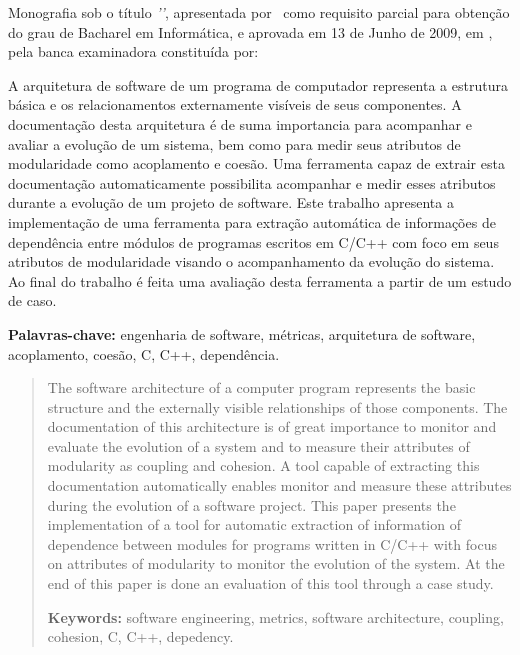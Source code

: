 

\capa
\folhaderosto

\begin{folhadeaprovacao}
 Monografia sob o título \textit{'\ABNTtitulodata'}, apresentada por
 \ABNTautordata\ como requisito parcial para obtenção do grau de Bacharel em
 Informática, e aprovada em 13 de Junho de 2009, em \ABNTlocaldata, pela banca
 examinadora constituída por:
\end{folhadeaprovacao}

\begin{resumo}
A arquitetura de software de um programa de computador representa a estrutura
básica e os relacionamentos externamente visíveis de seus componentes. A
documentação desta arquitetura é de suma importancia para acompanhar e avaliar
a evolução de um sistema, bem como para medir seus atributos de modularidade
como acoplamento e coesão. Uma ferramenta capaz de extrair esta documentação
automaticamente possibilita acompanhar e medir esses atributos durante a
evolução de um projeto de software. Este trabalho apresenta a implementação de
uma ferramenta para extração automática de informações de dependência entre
módulos de programas escritos em C/C++ com foco em seus atributos de
modularidade visando o acompanhamento da evolução do sistema. Ao final do
trabalho é feita uma avaliação desta ferramenta a partir de um
estudo de caso.

{\bf Palavras-chave:} engenharia de software, métricas, arquitetura de
software, acoplamento, coesão, C, C++, dependência.
\end{resumo}

\begin{abstract}
The software architecture of a computer program represents the basic structure
and the externally visible relationships of those components. The documentation
of this architecture is of great importance to monitor and evaluate the
evolution of a system and to measure their attributes of modularity as coupling
and cohesion. A tool capable of extracting this documentation automatically
enables monitor and measure these attributes during the evolution of a software
project. This paper presents the implementation of a tool for automatic
extraction of information of dependence between modules for programs written in
C/C++ with focus on attributes of modularity to monitor the evolution of the
system. At the end of this paper is done an evaluation of this
tool through a case study.

{\bf Keywords:} software engineering, metrics, software architecture, coupling,
cohesion, C, C++, depedency.
\end{abstract}

\sumario
\listadefiguras
\listadetabelas
\listadesiglas

{}
\clearpage
\apendice


